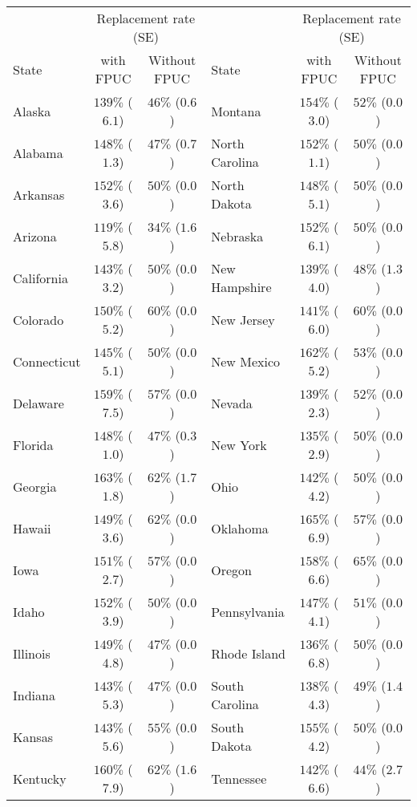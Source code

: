 \begin{tabular}{lcclcc}
\toprule
& \multicolumn{2}{c}{Replacement rate (SE)} & & \multicolumn{2}{c}{Replacement rate (SE)} \\ 
 \cmidrule(lr){2-3}\cmidrule(lr){5-6}
State & with FPUC & Without FPUC & State & with FPUC & Without FPUC \\ 
\midrule
Alaska & $139\%$ ($6.1$)  & $46\%$ ($0.6$)  & Montana & $154\%$ ($3.0$)  & $52\%$ ($0.0$)  \\ 
Alabama & $148\%$ ($1.3$)  & $47\%$ ($0.7$)  & North Carolina & $152\%$ ($1.1$)  & $50\%$ ($0.0$)  \\ 
Arkansas & $152\%$ ($3.6$)  & $50\%$ ($0.0$)  & North Dakota & $148\%$ ($5.1$)  & $50\%$ ($0.0$)  \\ 
Arizona & $119\%$ ($5.8$)  & $34\%$ ($1.6$)  & Nebraska & $152\%$ ($6.1$)  & $50\%$ ($0.0$)  \\ 
California & $143\%$ ($3.2$)  & $50\%$ ($0.0$)  & New Hampshire & $139\%$ ($4.0$)  & $48\%$ ($1.3$)  \\ 
Colorado & $150\%$ ($5.2$)  & $60\%$ ($0.0$)  & New Jersey & $141\%$ ($6.0$)  & $60\%$ ($0.0$)  \\ 
Connecticut & $145\%$ ($5.1$)  & $50\%$ ($0.0$)  & New Mexico & $162\%$ ($5.2$)  & $53\%$ ($0.0$)  \\ 
Delaware & $159\%$ ($7.5$)  & $57\%$ ($0.0$)  & Nevada & $139\%$ ($2.3$)  & $52\%$ ($0.0$)  \\ 
Florida & $148\%$ ($1.0$)  & $47\%$ ($0.3$)  & New York & $135\%$ ($2.9$)  & $50\%$ ($0.0$)  \\ 
Georgia & $163\%$ ($1.8$)  & $62\%$ ($1.7$)  & Ohio & $142\%$ ($4.2$)  & $50\%$ ($0.0$)  \\ 
Hawaii & $149\%$ ($3.6$)  & $62\%$ ($0.0$)  & Oklahoma & $165\%$ ($6.9$)  & $57\%$ ($0.0$)  \\ 
Iowa & $151\%$ ($2.7$)  & $57\%$ ($0.0$)  & Oregon & $158\%$ ($6.6$)  & $65\%$ ($0.0$)  \\ 
Idaho & $152\%$ ($3.9$)  & $50\%$ ($0.0$)  & Pennsylvania & $147\%$ ($4.1$)  & $51\%$ ($0.0$)  \\ 
Illinois & $149\%$ ($4.8$)  & $47\%$ ($0.0$)  & Rhode Island & $136\%$ ($6.8$)  & $50\%$ ($0.0$)  \\ 
Indiana & $143\%$ ($5.3$)  & $47\%$ ($0.0$)  & South Carolina & $138\%$ ($4.3$)  & $49\%$ ($1.4$)  \\ 
Kansas & $143\%$ ($5.6$)  & $55\%$ ($0.0$)  & South Dakota & $155\%$ ($4.2$)  & $50\%$ ($0.0$)  \\ 
Kentucky & $160\%$ ($7.9$)  & $62\%$ ($1.6$)  & Tennessee & $142\%$ ($6.6$)  & $44\%$ ($2.7$)  \\ 

\end{tabular}

